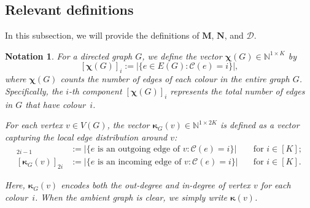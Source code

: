 \documentclass[12pt]{iopart}
\newtheorem{notation}[theorem]{Notation}
\newcommand*{\bbbchi}{\boldsymbol{\chi}}
\newcommand*{\bkappa}{\boldsymbol{\kappa}}
\begin{document}
\subsection{Relevant definitions}
In this subsection, we will provide the definitions of $\mathbf{M}$, $\mathbf{N}$, and $\mathcal{D}$.

\begin{notation}
For a directed graph $G$, we define the vector $\bbbchi(G)\in\mathbb{N}^{1 \times K}$ by
\[
  [\bbbchi (G)]_i := \big| \{ e \in E(G) : \mathscr{C}(e)=i \} \big| ,
\]
where $\bbbchi(G)$ counts the number of edges of each colour in the entire graph $G$. 
Specifically, the $i$-th component $[\bbbchi(G)]_i$ represents 
the total number of edges in $G$ that have colour~$i$.

For each vertex $v \in V(G)$, 
the vector $\bkappa_G(v)\in\mathbb{N}^{1 \times 2K}$ is defined as a vector capturing the local edge distribution around $v$:
  \begin{align*}
      [\bkappa_G(v)]_{2i-1} 
  &:= \big|\{ e\text{ is an outgoing edge of $v$} : \mathscr{C}(e)=i \} \big| \quad& \text{for } i \in [K] ;\\
      [\bkappa_G(v)]_{2i}
  &:= \big|\{ e\text{ is an incoming edge of $v$} : \mathscr{C}(e)=i \} \big| \quad& \text{for } i \in [K] .
  \end{align*}

Here, $\bkappa_G(v)$ encodes both the out-degree and in-degree of vertex $v$ for each colour~$i$. 
When the ambient graph is clear, we simply write $\bkappa(v)$.
\end{notation}
\end{document}
